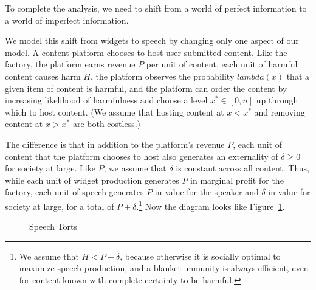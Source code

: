 To complete the analysis, we need to shift from a world of perfect information to a world of imperfect information.






We model this shift from widgets to speech by changing only one aspect of our model. A content platform chooses to host user-submitted content. Like the factory, the platform earns revenue $P$ per unit of content, each unit of harmful content causes harm $H$, the platform observes the probability $lambda(x)$ that a given item of content is harmful, and the platform can order the content by increasing likelihood of harmfulness and choose a level $x^* \in [0,n]$ up through which to host content. (We assume that hosting content at $x < x^*$ and removing content at $x > x^*$ are both costless.)

The difference is that in addition to the platform's revenue $P$, each unit of content that the platform chooses to host also generates an externality of  $\delta \ge 0$ for society at large. Like $P$, we assume that $\delta$ is constant across all content. Thus, while each unit of widget production generates $P$ in marginal profit for the factory, each unit of speech generates $P$ in value for the speaker and $\delta$ in value for society at large, for a total of $P + \delta$.\footnote{We assume that $H < P + \delta$, because otherwise it is socially optimal to maximize speech production, and a blanket immunity is always efficient, even for content known with complete certainty to be harmful.} Now the diagram looks like Figure~\ref{fig:speech}.

\begin{figure}[ht]
    \centering
{}
    \caption{Speech Torts}
    \label{fig:speech}
\end{figure}


